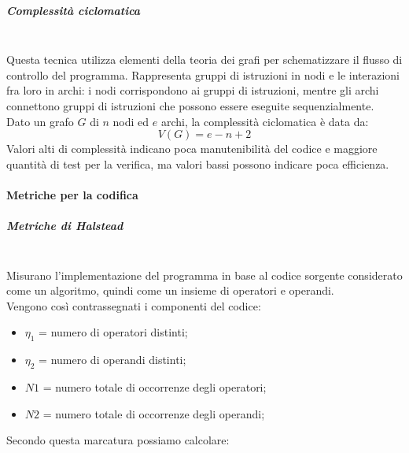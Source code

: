\subparagraph{Complessità ciclomatica}\mbox{}\\
Questa tecnica utilizza elementi della teoria dei grafi per schematizzare il flusso di controllo del programma. Rappresenta gruppi di istruzioni in nodi e le interazioni fra loro in archi: i nodi corrispondono ai gruppi di istruzioni, mentre gli archi connettono gruppi di istruzioni che possono essere eseguite sequenzialmente.\\
Dato un grafo $G$ di $n$ nodi ed $e$ archi, la complessità ciclomatica è data da:
\[ V\left(G\right) = e - n + 2 \]
Valori alti di complessità indicano poca manutenibilità del codice e maggiore quantità di test per la verifica, ma valori bassi possono indicare poca efficienza.

\paragraph{Metriche per la codifica}\mbox{}
\subparagraph{Metriche di Halstead}\mbox{}\\
Misurano l'implementazione del programma in base al codice sorgente considerato come un algoritmo, quindi come un insieme di operatori e operandi.\\
Vengono così contrassegnati i componenti del codice:
\begin{itemize}
	\item $\eta_{1}$ = numero di operatori distinti;
	\item $\eta_{2}$ = numero di operandi distinti;
	\item $N1$ = numero totale di occorrenze degli operatori; 
	\item $N2$ = numero totale di occorrenze degli operandi;
\end{itemize}
Secondo questa marcatura possiamo calcolare:
